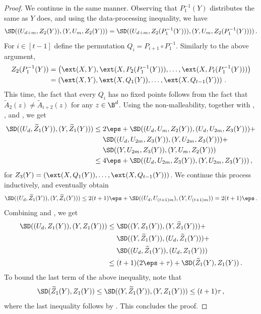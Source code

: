 \documentclass{toc}
\begin{document}
\begin{proof}
We continue in the same manner. Observing that $P_{1}^{-1}(Y)$ distributes the same as $Y$
does, and using the data-processing inequality, we have
\begin{equation}\label{eq:sec45}
\SD((U_{d+m},Z_{2}(Y)),(Y,U_m,Z_{2}(Y))) = 
\SD((U_{d+m},Z_{2}(P_{1}^{-1}(Y))),(Y,U_m,Z_{2}(P_{1}^{-1}(Y))))\,.
\end{equation}
For $i \in [t-1]$ define the permutation $Q_i = P_{i+1} \circ P_1^{-1}$.
Similarly to the above argument,
\begin{align*}
Z_{2}(P_{1}^{-1}(Y)) &= \left( \ext(X,Y),\ext(X,P_{2}(P_{1}^{-1}(Y))),\ldots,\ext(X,P_{t}(P_{1}^{-1}(Y))) \right) \\
&= \left( \ext(X,Y),\ext(X,Q_{1}(Y)),\ldots,\ext(X,Q_{t-1}(Y)) \right)\,.
\end{align*}
This time, the fact that every $Q_i$ has no
fixed points follows from the fact that $\widetilde{A}_{2}(z) \neq \widetilde{A}_{i+2}(z)$ for
any $z \in \B^{d}$. Using the non-malleability, together with
, ,
and , we get 
\begin{align*}
\SD((U_d,\widetilde{Z}_1(Y)),(Y,\widetilde{Z}_1(Y))) &\le 2\eps + \SD((U_{d},U_{m},Z_{2}(Y)),(U_{d},U_{2m},Z_{3}(Y))) + \\
&~~~~ \SD((U_d,U_{2m},Z_{3}(Y)),(Y,U_{2m},Z_{3}(Y))) + \\
&~~~~ \SD((Y,U_{2m},Z_{3}(Y)),(Y,U_{m},Z_{2}(Y))) \\
&\le 4\eps + \SD((U_d,U_{2m},Z_{3}(Y)),(Y,U_{2m},Z_{3}(Y)))\,,
\end{align*}
for $Z_{3}(Y) = \left( \ext(X,Q_{1}(Y)),\ldots,\ext(X,Q_{t-1}(Y)) \right)$. We continue
this process inductively, and eventually obtain
\begin{equation}\label{eq:sec46}
\SD((U_d,\widetilde{Z}_1(Y)),(Y,\widetilde{Z}_1(Y))) \le 2(t+1)\eps + \SD((U_d,U_{(t+1)m}),(Y,U_{(t+1)m})) = 2(t+1)\eps\,.
\end{equation}
Combining  and 
, we get
\begin{align*}
\SD((U_d,Z_1(Y)),(Y,Z_1(Y))) &\le \SD((Y,Z_1(Y)),(Y,\widetilde{Z}_{1}(Y))) + \\ &~~~~\SD((Y,\widetilde{Z}_1(Y)),(U_d,\widetilde{Z}_1(Y))) + \\
&~~~~\SD((U_d,\widetilde{Z}_1(Y)),(U_d,Z_{1}(Y))) \\
&\le (t+1)(2\eps+\tau) + \SD(\widetilde{Z}_1(Y),Z_{1}(Y))\,.
\end{align*}
To bound the last term of the above inequality, note that
\[
\SD(\widetilde{Z}_1(Y),Z_{1}(Y)) \le \SD((Y,\widetilde{Z}_1(Y)),(Y,Z_{1}(Y))) \le (t+1)\tau\,,
\]
where the last inequality follows by . This concludes the proof.
\end{proof}
\end{document}
